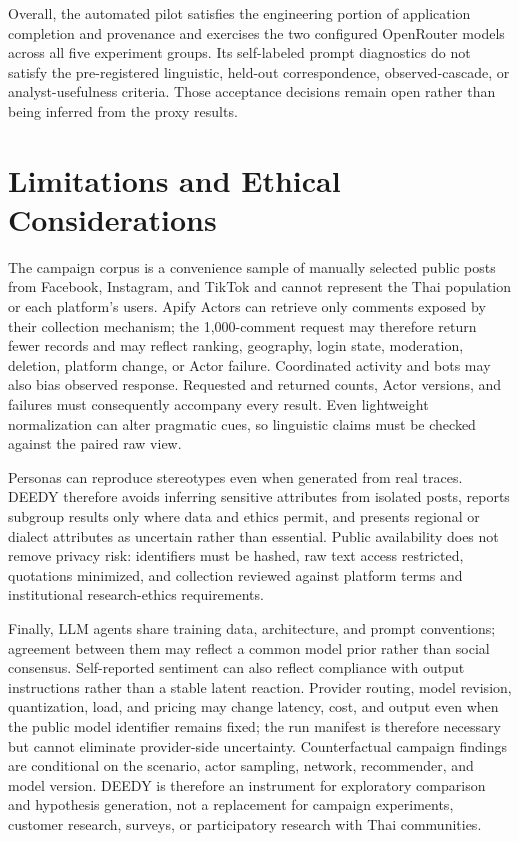 \documentclass[conference]{IEEEtran}
\begin{document}
Overall, the automated pilot satisfies the engineering portion of application
completion and provenance and exercises the two configured OpenRouter models
across all five experiment groups. Its self-labeled prompt diagnostics do not satisfy the pre-registered
linguistic, held-out correspondence, observed-cascade, or analyst-usefulness
criteria. Those acceptance decisions remain open rather than being inferred
from the proxy results.

\section{Limitations and Ethical Considerations}

The campaign corpus is a convenience sample of manually selected public posts
from Facebook, Instagram, and TikTok and cannot represent the Thai population
or each platform's users. Apify Actors can retrieve only comments exposed by
their collection mechanism; the 1,000-comment request may therefore return
fewer records and may reflect ranking, geography, login state, moderation,
deletion, platform change, or Actor failure. Coordinated activity and bots may
also bias observed response. Requested and returned counts, Actor versions,
and failures must consequently accompany every result. Even lightweight
normalization can alter pragmatic cues, so linguistic claims must be checked
against the paired raw view.

Personas can reproduce stereotypes even when generated from real traces.
DEEDY therefore avoids inferring sensitive attributes from isolated posts,
reports subgroup results only where data and ethics permit, and presents
regional or dialect attributes as uncertain rather than essential. Public
availability does not remove privacy risk: identifiers must be hashed, raw
text access restricted, quotations minimized, and collection reviewed against
platform terms and institutional research-ethics requirements.

Finally, LLM agents share training data, architecture, and prompt conventions;
agreement between them may reflect a common model prior rather than social
consensus. Self-reported sentiment can also reflect compliance with output
instructions rather than a stable latent reaction. Provider routing, model
revision, quantization, load, and pricing may change latency, cost, and output
even when the public model identifier remains fixed; the run manifest is
therefore necessary but cannot eliminate provider-side uncertainty.
Counterfactual campaign findings are conditional on the scenario,
actor sampling, network, recommender, and model version. DEEDY is therefore an
instrument for exploratory comparison and hypothesis generation, not a
replacement for campaign experiments, customer research, surveys, or
participatory research with Thai communities.
\end{document}
